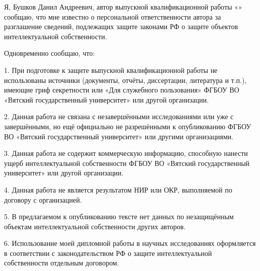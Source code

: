 \begin{singlespace}

	\newcommand{\authorfullname}{Бушков Данил Андреевич}
	\renewcommand{\authorwithinitials}{Бушков Д. А.}
	\renewcommand{\headofdepartment}{М. Л. Долженкова}

	Я, \authorfullname , автор выпускной квалификационной
	работы «\topic» сообщаю, что мне известно о персональной ответственности автора
	за разглашение сведений, подлежащих защите законами РФ о защите объектов
	интеллектуальной собственности.

	Одновременно сообщаю, что:

	1. При подготовке к защите выпускной квалификационной работы не
	использованы источники (документы, отчёты, диссертации, литература и т.п.),
	имеющие гриф секретности или «Для служебного пользования» ФГБОУ ВО
	«Вятский государственный университет» или другой организации.

	2. Данная работа не связана с незавершёнными исследованиями или уже
	с завершёнными, но ещё официально не разрешёнными к опубликованию
	ФГБОУ ВО «Вятский государственный университет» или другими
	организациями.

	3. Данная работа не содержит коммерческую информацию, способную
	нанести ущерб интеллектуальной собственности ФГБОУ ВО «Вятский
	государственный университет» или другой организации.

	4. Данная работа не является результатом НИР или ОКР, выполняемой по
	договору с организацией.

	5. В предлагаемом к опубликованию тексте нет данных по
	незащищённым объектам интеллектуальной собственности других авторов.

	6. Использование моей дипломной работы в научных исследованиях
	оформляется в соответствии с законодательством РФ о защите интеллектуальной
	собственности отдельным договором.

	\newcommand{\daysize}{2em}

	\newcommand{\confirm}{
		\noindent
		Сведения по авторской справке подтверждаю:~«\uline{\hspace{\daysize}}»
	}

	\newcommand{\verticalspacesize}{2em}

	\newcommand{\rightindent}{2em}

	\newcommand{\customtheyear}{\the\year~г.}

	\newcommand{\rightindentwithyear}{\widthof{\customtheyear}+\rightindent}

	\newcommand{\signaturesize}{6.6em}


\end{singlespace}
